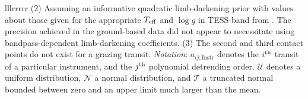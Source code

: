 \begin{deluxetable*}{lllrrrrr}
{%
%
(2) Assuming an informative quadratic limb-darkening prior with
values about those given for the appropriate $T_{\rm eff}$ and
$\log g$ in TESS-band from \citet{claret_limb_2017}. The precision
achieved in the ground-based data did not appear to necessitate using
bandpass-dependent limb-darkening coefficients.
(3) The second and third contact points do not exist for a grazing transit.
{\it Notation}:
$a_{ij;\mathrm{Instr}}$ denotes the $i^{\rm th}$ transit of a
particular instrument, and the $j^{\rm th}$ polynomial detrending
order.
$\mathcal{U}$ denotes a uniform distribution,
$\mathcal{N}$ a normal distribution, and
$\mathcal{T}$ a truncated normal bounded between zero and an upper limit much larger than the mean.
}
\vspace{-0.3cm}
\end{deluxetable*}
